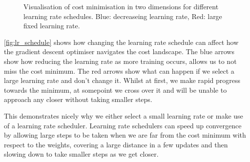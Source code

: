 \begin{figure}
\begin{center}
\caption{Visualisation of cost minimisation in two dimensions for different learning rate schedules. Blue: decreaseing learning rate, Red: large fixed learning rate.}
\label{fig:lr_schedule}
\end{center}
\end{figure}

\autoref{fig:lr_schedule} shows how changing the learning rate schedule can affect how the gradient descent optimiser navigates the cost landscape. The blue arrows show how reducing the learning rate as more training occurs, allows us to not miss the cost minimum. The red arrows show what can happen if we select a large learning rate and don't change it. Whilst at first, we make rapid progress towards the minimum, at somepoint we cross over it and will be unable to approach any closer without taking smaller steps.

This demonstrates nicely why we either select a small learning rate or make use of a learning rate scheduler.
Learning rate schedulers can speed up convergence by allowing large steps to be taken when we are far from the cost minimum with respect to the weights, covering a large distance in a few updates and then slowing down to take smaller steps as we get closer. 

